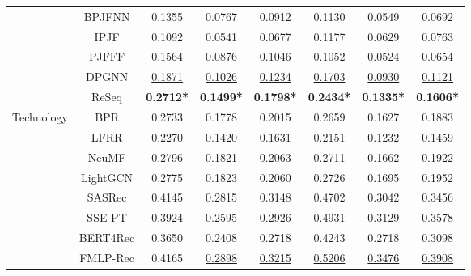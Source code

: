 \begin{table}[]
{{\begin{tabular}{@{}cccccccc@{}}
                             & BPJFNN      & 0.1355          & 0.0767          & 0.0912          & 0.1130           & 0.0549          & 0.0692          \\
                             & IPJF        & 0.1092          & 0.0541          & 0.0677          & 0.1177          & 0.0629          & 0.0763          \\
                             & PJFFF       & 0.1564          & 0.0876          & 0.1046          & 0.1052          & 0.0524          & 0.0654          \\
                             & DPGNN       & \underline{0.1871}    & \underline{0.1026}    & \underline{0.1234}    & \underline{0.1703}    & \underline{0.0930}     & \underline{0.1121}    \\ \cmidrule(l){2-8}
                             & ReSeq        & \textbf{0.2712*} & \textbf{0.1499*} & \textbf{0.1798*} & \textbf{0.2434*} & \textbf{0.1335*} & \textbf{0.1606*} \\ \midrule
\multirow{13}{*}{Technology} & BPR         & 0.2733          & 0.1778          & 0.2015          & 0.2659          & 0.1627          & 0.1883          \\
                             & LFRR        & 0.2270           & 0.1420           & 0.1631          & 0.2151          & 0.1232          & 0.1459          \\
                             & NeuMF       & 0.2796          & 0.1821          & 0.2063          & 0.2711          & 0.1662          & 0.1922          \\
                             & LightGCN    & 0.2775          & 0.1823          & 0.2060           & 0.2726          & 0.1695          & 0.1952          \\ \cmidrule(l){2-8}
                             & SASRec      & 0.4145          & 0.2815          & 0.3148          & 0.4702          & 0.3042          & 0.3456          \\
                             & SSE-PT      & 0.3924	& 0.2595	& 0.2926   & 0.4931	& 0.3129	& 0.3578\\
                             & BERT4Rec    & 0.3650           & 0.2408          & 0.2718          & 0.4243          & 0.2718          & 0.3098          \\
                             & FMLP-Rec     & 0.4165          & \underline{0.2898}    & \underline{0.3215}    & \underline{0.5206}    & \underline{0.3476}    & \underline{0.3908}    \\ \cmidrule(l){2-8}

\end{tabular}}}
\end{table}
